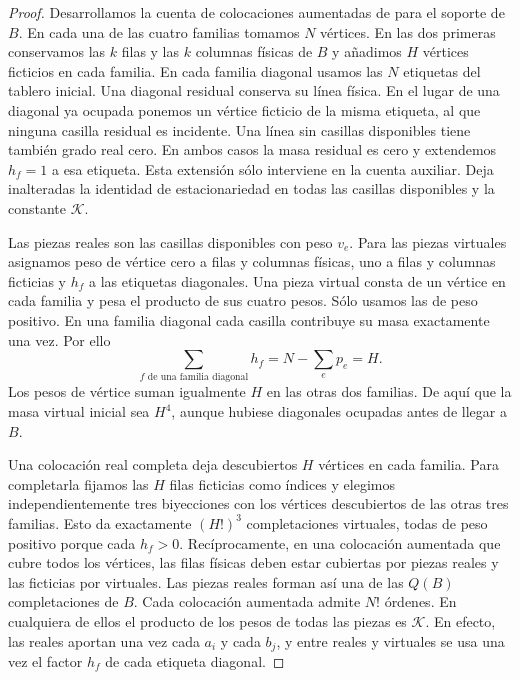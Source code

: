 \begin{proof}
Desarrollamos la cuenta de colocaciones aumentadas de \cite[Secciones~3.1--3.4 y
Teorema~3.6]{ultimas} para el soporte de $B$. En cada una de las cuatro familias tomamos $N$ vértices.
En las dos primeras conservamos las $k$ filas y las $k$ columnas físicas de $B$ y añadimos $H$ vértices
ficticios en cada familia. En cada familia diagonal usamos las $N$ etiquetas del tablero inicial. Una
diagonal residual conserva su línea física. En el lugar de una diagonal ya ocupada ponemos un vértice
ficticio de la misma etiqueta, al que ninguna casilla residual es incidente. Una línea sin casillas
disponibles tiene también grado real cero. En ambos casos la masa residual es cero y extendemos $h_f=1$
a esa etiqueta. Esta extensión sólo interviene en la cuenta auxiliar. Deja inalteradas la identidad de
estacionariedad en todas las casillas disponibles y la constante $\mathcal K$.

Las piezas reales son las casillas disponibles con peso $v_e$. Para las piezas virtuales asignamos
peso de vértice cero a filas y columnas físicas, uno a filas y columnas ficticias y $h_f$ a las
etiquetas diagonales. Una pieza virtual consta de un vértice en cada familia y pesa el producto de sus
cuatro pesos. Sólo usamos las de peso positivo. En una familia diagonal cada casilla contribuye su
masa exactamente una vez. Por ello
\[
 \sum_{f\text{ de una familia diagonal}}h_f=N-\sum_e p_e=H.
\]
Los pesos de vértice suman igualmente $H$ en las otras dos familias. De aquí que la masa virtual
inicial sea $H^4$, aunque hubiese diagonales ocupadas antes de llegar a $B$.

Una colocación real completa deja descubiertos $H$ vértices en cada familia. Para completarla fijamos
las $H$ filas ficticias como índices y elegimos independientemente tres biyecciones con los vértices
descubiertos de las otras tres familias. Esto da exactamente $(H!)^3$ completaciones virtuales, todas
de peso positivo porque cada $h_f>0$. Recíprocamente, en una colocación aumentada que cubre todos los
vértices, las filas físicas deben estar cubiertas por piezas reales y las ficticias por virtuales. Las
piezas reales forman así una de las $Q(B)$ completaciones de $B$. Cada colocación aumentada admite $N!$
órdenes. En cualquiera de ellos el producto de los pesos de todas las piezas es $\mathcal K$. En
efecto, las reales aportan una vez cada $a_i$ y cada $b_j$, y entre reales y virtuales se usa una vez
el factor $h_f$ de cada etiqueta diagonal.


\end{proof}
